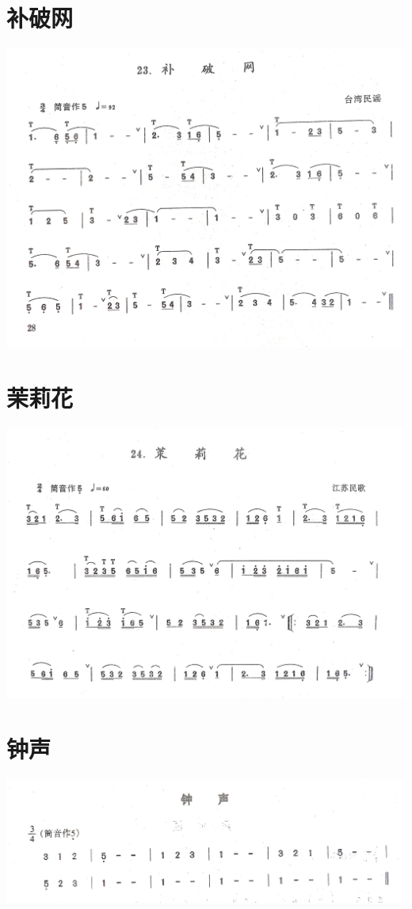 \documentclass[cn,pad,chinese,chinesefont=nofont]{elegantbook}
\begin{document}
\section{补破网}           
	\includegraphics[width=\textwidth]{dongxiao/IMG_0936.jpg}
\section{茉莉花}           
	\includegraphics[width=\textwidth]{dongxiao/IMG_0937.jpg}   
\section{钟声}        
	\includegraphics[width=\textwidth]{dongxiao/IMG_0943.jpg}   
\end{document}
